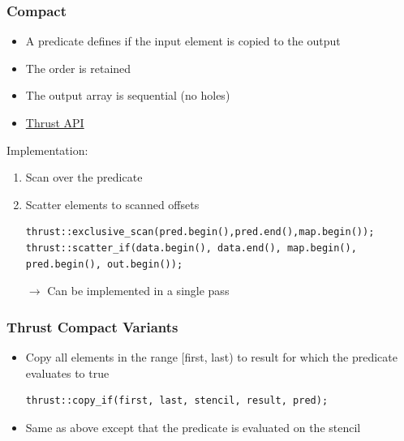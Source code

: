 \documentclass[aspectratio=169]{beamer}
\begin{document}
\begin{frame}[fragile]
\frametitle{Compact}
\begin{itemize}
	\item A predicate defines if the input element is copied to the output
	\item<2-> The order is retained
	\item<2-> The output array is sequential (no holes)
	\item<2-> \href{https://thrust.github.io/doc/group__stream__compaction.html}{Thrust API}
\end{itemize}
Implementation:
\begin{enumerate}
	\item Scan over the predicate
	\item Scatter elements to scanned offsets
\begin{lstlisting}
thrust::exclusive_scan(pred.begin(),pred.end(),map.begin());
thrust::scatter_if(data.begin(), data.end(), map.begin(), pred.begin(), out.begin());
\end{lstlisting}
\item [$\rightarrow$] Can be implemented in a single pass
\end{enumerate}
\end{frame}

\begin{frame}[fragile]
\frametitle{Thrust Compact Variants}

\begin{itemize}
\begin{lstlisting}
thrust::copy_if(first, last, result, pred);		
\end{lstlisting}
	\item Copy all elements in the range [first, last) to result for which the predicate evaluates to true
\begin{lstlisting}
thrust::copy_if(first, last, stencil, result, pred);		
\end{lstlisting}
\item Same as above except that the predicate is evaluated on the stencil
\end{itemize}
\end{frame}
\end{document}
